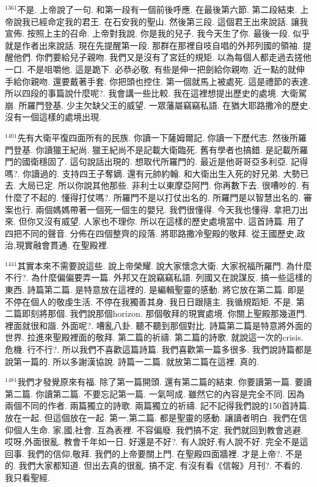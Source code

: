 \documentclass{book}
\begin{document}
$^{1361}$不是.
上帝說了一句.
和第一段有一個前後呼應.
在最後第六節.
第二段結束.
上帝說我已經命定我的君王.
在石安我的聖山.
然後第三段.
這個君王出來說話.
讓我宣佈.
按照上主的召命.
上帝對我說.
你是我的兒子.
我今天生了你.
最後一段.
似乎就是作者出來說話.
現在先提醒第一段.
那群在那裡自吱自唱的外邦列國的領袖.
提醒他們.
你們要給兒子親吻.
我們又是沒有了宮廷的規矩.
以為每個人都走過去搓他一口.
不是咀嚼他.
這是跪下.
必恭必敬.
有些是伸一把劍給你親吻.
近一點的就伸手給你親吻.
還要戴著手套.
你把頭也控住.
第一個就馬上被處死.
這是禮節的表達.
所以四段的事篇說什麼呢?.
我會講一些比較.
我在這裡想提出歷史的處境.
大衛駕崩.
所羅門登基.
少主欠缺父王的威望.
一眾藩屬竊竊私語.
在猶大耶路撒冷的歷史.
沒有一個這樣的處境出現.

$^{1401}$先有大衛平復四面所有的民族.
你讀一下薩姆爾記.
你讀一下歷代志.
然後所羅門登基.
你讀獵王紀尚.
獵王紀尚不是記載大衛臨死.
舊有學者也搞錯.
是記載所羅門的國衛穩固了.
這句說話出現的.
想取代所羅門的.
最近是他哥哥亞多利亞.
記得嗎?.
你讀過的.
支持四王子奪嫡.
還有元帥約翰.
和大衛出生入死的好兄弟.
大勢已去.
大局已定.
所以你說其他那些.
非利士以東摩亞阿門.
你再數下去.
很嘈吵的.
有什麼了不起的.
懂得打仗嗎?.
所羅門不是以打仗出名的.
所羅門是以智慧出名的.
審案也行.
兩個媽媽帶著一個死一個生的嬰兒.
我們很懂得.
今天我也懂得.
拿把刀出來.
但你又沒有威望.
人家也不理你.
所以在這樣的歷史處境當中.
這首詩篇.
用了四把不同的聲音.
分佈在四個整齊的段落.
將耶路撒冷聖殿的敬拜.
從王國歷史,政治,現實融會貫通.
在聖殿裡.

$^{1441}$其實本來不需要說這些.
說上帝榮耀.
說大家懷念大衛.
大家祝福所羅門.
為什麼不行?.
為什麼偏偏要弄一篇.
外邦又在說竊竊私語.
列國又在說謀反.
搞一些這樣的東西.
詩篇第二篇.
是特意放在這裡的.
是編輯聖靈的感動.
將它放在第二篇.
即是不停在個人的敬虔生活.
不停在我獨善其身.
我日日跟隨主.
我循規蹈矩.
不是.
第二篇即刻將那個.
我們說那個horizon.
那個敬拜的現實處境.
你關上聖殿那幾道門.
裡面就很和諧.
外面呢?.
嘈亂八卦.
聽不聽到那個對比.
詩篇第二篇是特意將外面的世界.
拉進來聖殿裡面的敬拜.
第二篇的祈禱.
第二篇的詩歌.
就說這一次的crisis.
危機.
行不行?.
所以我們不喜歡這篇詩篇.
我們喜歡第一篇多很多.
我們說詩篇都是說第一篇的.
所以多謝漢協說.
詩篇一二篇.
就放第二篇在這裡.
真的.

$^{1481}$我們才發覺原來有福.
除了第一篇開頭.
還有第二篇的結束.
你要讀第一篇.
要讀第二篇.
你讀第二篇.
不要忘記第一篇.
一氣呵成.
雖然它的內容是完全不同.
因為兩個不同的作者.
兩篇獨立的詩歌.
兩篇獨立的祈禱.
記不記得我們說的150首詩篇.
放在一起.
但這個放在一起.
第一,第二篇.
都是聖靈的感動.
讓讀者明白.
我們在信仰個人生命.
家,國,社會.
互為表裡.
不容偏廢.
我們搞不定.
我們就回到教會逃避.
哎呀,外面很亂.
教會千年如一日.
好還是不好?.
有人說好,有人說不好.
完全不是這回事.
我們的信仰,敬拜.
我們的上帝要關上門.
在聖殿四面牆裡.
才是上帝?.
不是的.
我們大家都知道.
但出去真的很亂.
搞不定.
有沒有看《信報》月刊?.
不看的.
我只看聖經.
\end{document}
